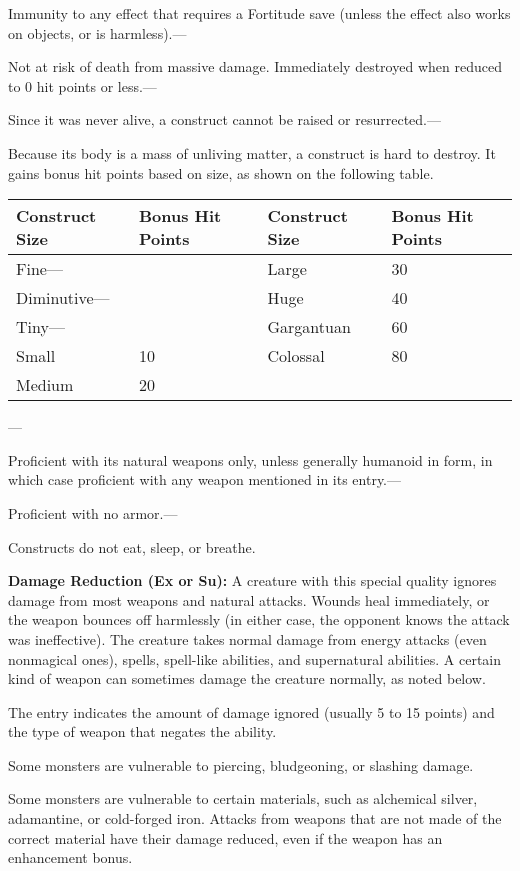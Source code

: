 \documentclass{article}
\begin{document}
Immunity to any effect that requires a Fortitude save (unless the effect also works 
on objects, or is harmless).---

Not at risk of death from massive damage. Immediately destroyed when reduced to 
0 hit points or less.---

Since it was never alive, a construct cannot be raised or resurrected.---

Because its body is a mass of unliving matter, a construct is hard to destroy. 
It gains bonus hit points based on size, as shown on the following table.

\begin{tabular}{|>{\raggedright}p{61pt}|>{\raggedright}p{46pt}|>{\raggedright}p{60pt}|>{\raggedright}p{42pt}|}
\hline
C\textbf{onstruct Size} & B\textbf{onus Hit Points} & C\textbf{onstruct Size} & B\textbf{onus 
Hit Points}\tabularnewline
\hline
Fine--- &  & Large & 30\tabularnewline
\hline
Diminutive--- &  & Huge & 40\tabularnewline
\hline
Tiny--- &  & Gargantuan & 60\tabularnewline
\hline
Small & 10 & Colossal & 80\tabularnewline
\hline
Medium & 20 &  & \tabularnewline
\hline
\end{tabular}---

Proficient with its natural weapons only, unless generally humanoid in form, in 
which case proficient with any weapon mentioned in its entry.---

Proficient with no armor.---

Constructs do not eat, sleep, or breathe.

\vspace{12pt}
\textbf{Damage Reduction (Ex or Su):} A creature with this special quality ignores 
damage from most weapons and natural attacks. Wounds heal immediately, or the weapon 
bounces off harmlessly (in either case, the opponent knows the attack was ineffective). 
The creature takes normal damage from energy attacks (even nonmagical ones), spells, 
spell-like abilities, and supernatural abilities. A certain kind of weapon can 
sometimes damage the creature normally, as noted below.

The entry indicates the amount of damage ignored (usually 5 to 15 points) and the 
type of weapon that negates the ability. 

Some monsters are vulnerable to piercing, bludgeoning, or slashing damage. 

Some monsters are vulnerable to certain materials, such as alchemical silver, adamantine, 
or cold-forged iron. Attacks from weapons that are not made of the correct material 
have their damage reduced, even if the weapon has an enhancement bonus.
\end{document}
